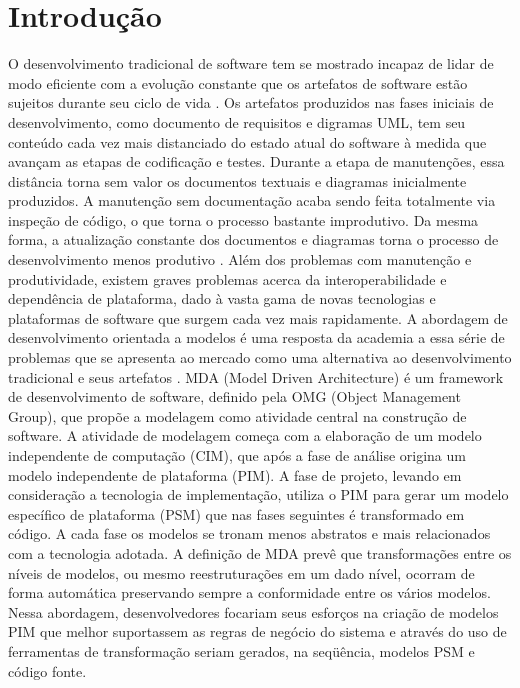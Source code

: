 \chapter{Introdução}
\label{cap:introducao}

O desenvolvimento tradicional de software tem se mostrado incapaz de lidar de modo eficiente com a evolução constante que os artefatos de software estão sujeitos durante seu ciclo de vida \citep{Kleppe:2003}. Os artefatos produzidos nas fases iniciais de desenvolvimento, como documento de requisitos e digramas UML, tem seu conteúdo cada vez mais distanciado do estado atual do software à medida que avançam as etapas de codificação e testes. Durante a etapa de manutenções, essa distância torna sem valor os documentos textuais e diagramas inicialmente produzidos.
A manutenção sem documentação acaba sendo feita totalmente via inspeção de código, o que torna o processo bastante improdutivo. Da mesma forma, a atualização constante dos documentos e diagramas torna o processo de desenvolvimento menos produtivo \citep{Kleppe:2003}. Além dos problemas com manutenção e produtividade, existem graves problemas acerca da interoperabilidade e dependência de plataforma, dado à vasta gama de novas tecnologias e plataformas de software que surgem cada vez mais rapidamente.
A abordagem de desenvolvimento orientada a modelos é uma resposta da academia a essa série de problemas que se apresenta ao mercado como uma alternativa ao desenvolvimento tradicional e seus artefatos \citep{Frankel:2002}. MDA (Model Driven Architecture) é um framework de desenvolvimento de software, definido pela OMG (Object Management Group), que propõe a modelagem como atividade central na construção de software.
 	A atividade de modelagem começa com a elaboração de um modelo independente de computação (CIM), que após a fase de análise origina um modelo independente de plataforma (PIM). A fase de projeto, levando em consideração a tecnologia de implementação, utiliza o PIM para gerar um modelo específico de plataforma (PSM) que nas fases seguintes é transformado em código. A cada fase os modelos se tronam menos abstratos e mais relacionados com a tecnologia adotada. 
	A definição de MDA prevê que transformações entre os níveis de modelos, ou mesmo reestruturações em um dado nível, ocorram de forma automática preservando sempre a conformidade entre os vários modelos. Nessa abordagem, desenvolvedores focariam seus esforços na criação de modelos PIM que melhor suportassem as regras de negócio do sistema e através do uso de ferramentas de transformação seriam gerados, na seqüência, modelos PSM e código fonte.
